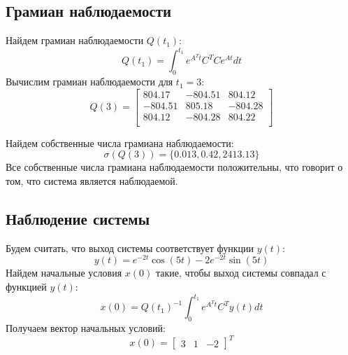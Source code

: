 \subsection{Грамиан наблюдаемости}
Найдем грамиан наблюдаемости $Q(t_1)$:
\begin{equation}
    Q(t_1) = \int_0^{t_1} e^{A^Tt}C^TCe^{At}dt
\end{equation}
Вычислим грамиан наблюдаемости для $t_1 = 3$:
\begin{equation}
    Q(3) = \begin{bmatrix}
        804.17  & -804.51  & 804.12 \\ 
        -804.51  & 805.18  & -804.28 \\ 
        804.12  & -804.28  & 804.22 \\ 
        \end{bmatrix}
\end{equation}

Найдем собственные числа грамиана наблюдаемости:
\begin{equation}
    \sigma(Q(3)) = \{0.013, 0.42, 2413.13\}
\end{equation}
Все собственные числа грамиана наблюдаемости положительны, что говорит о том, что система является наблюдаемой.

\subsection{Наблюдение системы}
Будем считать, что выход системы соответствует функции $y(t)$:
\begin{equation}
    y(t) = e^{-2t} \cos(5t) -2e^{-2t} \sin(5t) 
\end{equation}
Найдем начальные условия $x(0)$ такие, чтобы выход системы совпадал с функцией $y(t)$:
\begin{equation}
    x(0) = Q(t_1)^{-1} \int_0^{t_1} e^{A^Tt}C^Ty(t)dt
\end{equation}
Получаем вектор начальных условий:
\begin{equation}
    x(0) = \begin{bmatrix}
        3 & 1 & -2
    \end{bmatrix}^T
\end{equation}


